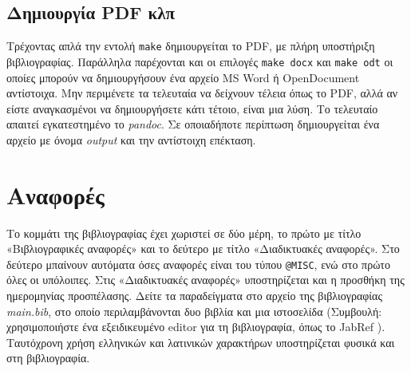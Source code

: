 \subsection{Δημιουργία PDF κλπ}

Τρέχοντας απλά την εντολή \verb|make| δημιουργείται το PDF, με πλήρη
υποστήριξη βιβλιογραφίας. Παράλληλα παρέχονται και οι επιλογές
\verb|make docx| και \verb|make odt| οι οποίες μπορούν να δημιουργήσουν
ένα αρχείο MS Word ή OpenDocument αντίστοιχα. Μην περιμένετε τα
τελευταία να δείχνουν τέλεια όπως το PDF, αλλά αν είστε αναγκασμένοι να
δημιουργήσετε κάτι τέτοιο, είναι μια λύση. Το τελευταίο απαιτεί
εγκατεστημένο το \emph{pandoc}. Σε οποιαδήποτε περίπτωση δημιουργείται
ένα αρχείο με όνομα \emph{output} και την αντίστοιχη επέκταση.

\section{Αναφορές}

Το κομμάτι της βιβλιογραφίας έχει χωριστεί σε δύο μέρη, το πρώτο με
τίτλο «Βιβλιογραφικές αναφορές» και το δεύτερο με τίτλο «Διαδικτυακές
αναφορές». Στο δεύτερο μπαίνουν αυτόματα όσες αναφορές είναι του τύπου
\verb|@MISC|, ενώ στο πρώτο όλες οι υπόλοιπες. Στις «Διαδικτυακές
αναφορές» υποστηρίζεται και η προσθήκη της ημερομηνίας προσπέλασης.
Δείτε τα παραδείγματα στο αρχείο της βιβλιογραφίας \emph{main.bib}, στο
οποίο περιλαμβάνονται δυο βιβλία \cite{goossens93}\cite{Syropoulos} και
μια ιστοσελίδα \cite{JABREF} (Συμβουλή: χρησιμοποιήστε ένα εξειδικευμένο
editor για τη βιβλιογραφία, όπως το JabRef \cite{JABREF}). Ταυτόχρονη
χρήση ελληνικών και λατινικών χαρακτήρων υποστηρίζεται φυσικά και στη
βιβλιογραφία.

